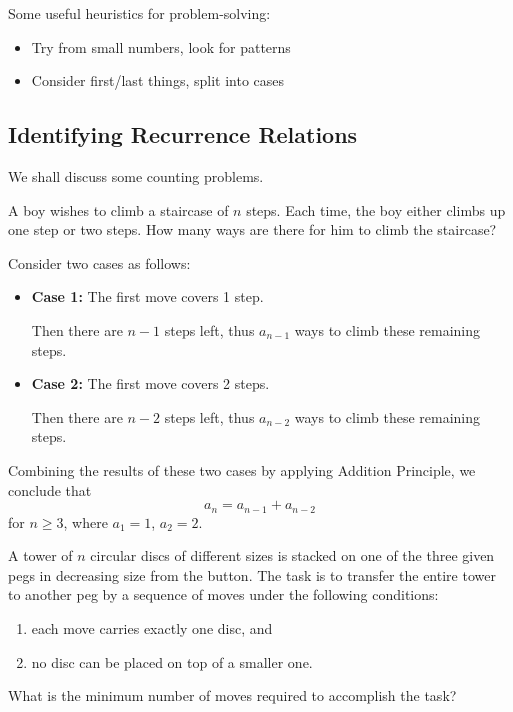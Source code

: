 Some useful heuristics for problem-solving:
\begin{itemize}
\item Try from small numbers, look for patterns
\item Consider first/last things, split into cases
\end{itemize}
\pagebreak

\subsection{Identifying Recurrence Relations}
We shall discuss some counting problems.

\begin{example}
A boy wishes to climb a staircase of $n$ steps. Each time, the boy either climbs up one step or two steps. How many ways are there for him to climb the staircase?
\end{example}

\begin{solution}
Consider two cases as follows:
\begin{itemize}
\item \textbf{Case 1:} The first move covers 1 step.

Then there are $n-1$ steps left, thus $a_{n-1}$ ways to climb these remaining steps.

\item \textbf{Case 2:} The first move covers 2 steps.

Then there are $n-2$ steps left, thus $a_{n-2}$ ways to climb these remaining steps.
\end{itemize}

Combining the results of these two cases by applying Addition Principle, we conclude that
\[ a_n=a_{n-1}+a_{n-2} \]
for $n\ge3$, where $a_1=1$, $a_2=2$.
\end{solution}

\begin{example}
A tower of $n$ circular discs of different sizes is stacked on one of the three given pegs in decreasing size from the button. The task is to transfer the entire tower to another peg by a sequence of moves under the following conditions:
\begin{enumerate}[label=(\roman*)]
\item each move carries exactly one disc, and
\item no disc can be placed on top of a smaller one.
\end{enumerate}
What is the minimum number of moves required to accomplish the task?
\end{example}

